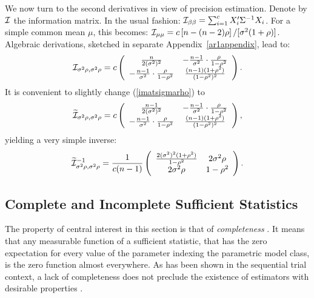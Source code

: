 \documentclass[11pt,a5paper,twoside]{book}
\begin{document}
We now turn to the second derivatives in view of precision estimation. Denote by $\cal I$ the information matrix. In the usual fashion:
${\cal I}_{\beta\beta}=\sum_{i=1}^cX_i'\Sigma^{-1}X_i$.
For a simple common mean $\mu$, this becomes:
${\cal I}_{\mu\mu}=c\left[n-(n-2)\rho\right]/[\sigma^2(1+\rho)]$.
Algebraic derivations, sketched in separate Appendix~\ref{ar1appendix}, lead to:
\begin{equation}
\label{imatsigmarho}
{\cal I}_{\sigma^2\rho,\sigma^2\rho}=
c\left(
\begin{array}{cc}
\frac{n}{2(\sigma^2)^2}
&
-\frac{n-1}{\sigma^2}\cdot\frac{\rho}{1-\rho^2}\\
-\frac{n-1}{\sigma^2}\cdot\frac{\rho}{1-\rho^2}&
\frac{(n-1)(1+\rho^2)}{(1-\rho^2)^2}
\end{array}
\right)
.
\end{equation}
It is convenient to slightly change (\ref{imatsigmarho}) to
\begin{equation}
\label{imatsigmarhotilde}
\widetilde{\cal I}_{\sigma^2\rho,\sigma^2\rho}=
c\left(
\begin{array}{cc}
\frac{n-1}{2(\sigma^2)^2}
&
-\frac{n-1}{\sigma^2}\cdot\frac{\rho}{1-\rho^2}\\
-\frac{n-1}{\sigma^2}\cdot\frac{\rho}{1-\rho^2}&
\frac{(n-1)(1+\rho^2)}{(1-\rho^2)^2}
\end{array}
\right)
,
\end{equation}
yielding a very simple inverse:
\begin{equation}
\label{imatsigmarhotildeinverse}
\widetilde{\cal I}^{-1}_{\sigma^2\rho,\sigma^2\rho}=
\frac{1}{c(n-1)}
\left(
\begin{array}{cc}
\frac{2(\sigma^2)^2(1+\rho^2)}{1-\rho^2}&2\sigma^2\rho\\
2\sigma^2\rho&1-\rho^2
\end{array}
\right)
.
\end{equation}


\subsection{Complete and Incomplete Sufficient Statistics}
\label{secincomplete}

The property of central interest in this section is that of  {\em completeness\/} \citep[pp.~285--286]{casella2002statistical}. It means that any measurable function of a sufficient statistic, that has the zero expectation for every value of the parameter indexing the parametric model class, is the zero function almost everywhere.  As has been shown in the sequential trial context, a lack of completeness does not preclude the existence of estimators with desirable properties  \citep{molenberghs2014random}.
\end{document}
